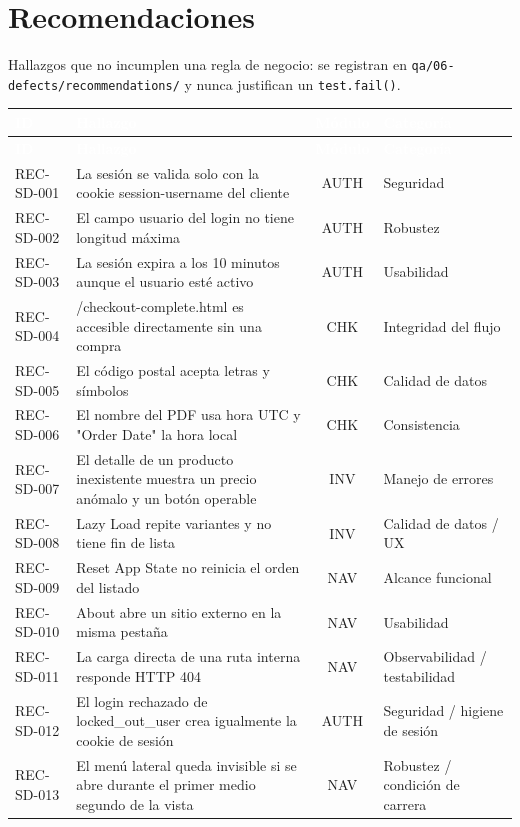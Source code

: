 \documentclass[10pt,a4paper]{article}
\newcommand{\tabhead}{\rowcolor{primary}}
\newcommand{\hcell}[1]{\textcolor{white}{\bfseries #1}}
\newcommand{\zebrarows}{\rowcolors{2}{zebra}{white}}
\begin{document}
\section{Recomendaciones}
Hallazgos que no incumplen una regla de negocio: se registran en \texttt{qa/06-defects/recommendations/} y nunca justifican un \texttt{test.fail()}.

{\zebrarows\footnotesize
\begin{longtable}{|L{0.1\textwidth}|L{0.53\textwidth}|c|L{0.2\textwidth}|}
\hline
\tabhead \hcell{ID} & \hcell{Hallazgo} & \hcell{Módulo} & \hcell{Categoría} \\ \hline
\endfirsthead
\hline
\tabhead \hcell{ID} & \hcell{Hallazgo} & \hcell{Módulo} & \hcell{Categoría} \\ \hline
\endhead
REC-SD-001 & La sesión se valida solo con la cookie session-username del cliente & AUTH & Seguridad \\ \hline
REC-SD-002 & El campo usuario del login no tiene longitud máxima & AUTH & Robustez \\ \hline
REC-SD-003 & La sesión expira a los 10 minutos aunque el usuario esté activo & AUTH & Usabilidad \\ \hline
REC-SD-004 & /\allowbreak{}checkout-complete.html es accesible directamente sin una compra & CHK & Integridad del flujo \\ \hline
REC-SD-005 & El código postal acepta letras y símbolos & CHK & Calidad de datos \\ \hline
REC-SD-006 & El nombre del PDF usa hora UTC y "Order Date" la hora local & CHK & Consistencia \\ \hline
REC-SD-007 & El detalle de un producto inexistente muestra un precio anómalo y un botón operable & INV & Manejo de errores \\ \hline
REC-SD-008 & Lazy Load repite variantes y no tiene fin de lista & INV & Calidad de datos /\allowbreak{} UX \\ \hline
REC-SD-009 & Reset App State no reinicia el orden del listado & NAV & Alcance funcional \\ \hline
REC-SD-010 & About abre un sitio externo en la misma pestaña & NAV & Usabilidad \\ \hline
REC-SD-011 & La carga directa de una ruta interna responde HTTP 404 & NAV & Observabilidad /\allowbreak{} testabilidad \\ \hline
REC-SD-012 & El login rechazado de locked\_\allowbreak{}out\_\allowbreak{}user crea igualmente la cookie de sesión & AUTH & Seguridad /\allowbreak{} higiene de sesión \\ \hline
REC-SD-013 & El menú lateral queda invisible si se abre durante el primer medio segundo de la vista & NAV & Robustez /\allowbreak{} condición de carrera \\ \hline
\end{longtable}}
\end{document}
